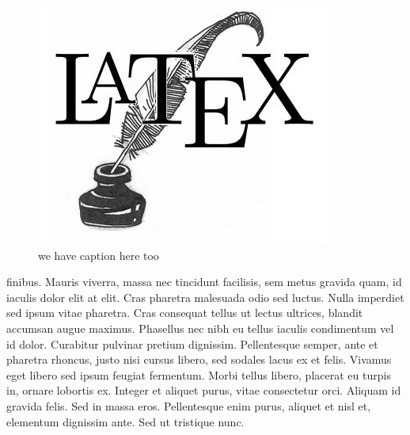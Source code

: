 \documentclass[letterpaper,12pt]{book}
\begin{document}
	\begin{figure}
		\includegraphics[scale=0.5]{./pics/logo.png}
		\caption{we have caption here too}
	\end{figure}
	finibus. Mauris viverra, massa nec tincidunt facilisis, sem metus gravida quam, id iaculis dolor elit at elit. Cras pharetra malesuada odio sed luctus. Nulla imperdiet sed ipsum vitae pharetra. Cras consequat tellus ut lectus ultrices, blandit accumsan augue maximus. Phasellus nec nibh eu tellus iaculis condimentum vel id dolor. Curabitur pulvinar pretium dignissim. Pellentesque semper, ante et pharetra rhoncus, justo nisi cursus libero, sed sodales lacus ex et felis. Vivamus eget libero sed ipsum feugiat fermentum. Morbi tellus libero, placerat eu turpis in, ornare lobortis ex. Integer et aliquet purus, vitae consectetur orci. Aliquam id gravida felis. Sed in massa eros. Pellentesque enim purus, aliquet et nisl et, elementum dignissim ante. Sed ut tristique nunc.
\end{document}
